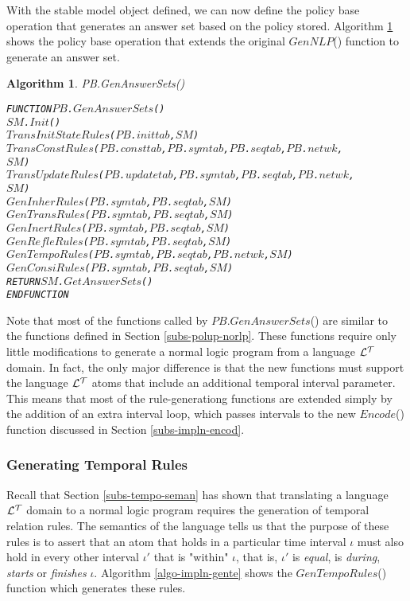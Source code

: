 \documentclass[11pt]{report}
\newenvironment{vverbatim}
{
  \begin{alltt}
}
{
    \vspace{-\baselineskip}
  \end{alltt}
}
\newtheorem{vvalgorithm}{Algorithm}[chapter]
\newenvironment{valgorithm}[2]
{
  \begin{vvalgorithm}{#1}
    \label{#2}
    \small
    \begin{vverbatim}
}
{
    \end{vverbatim}
  \end{vvalgorithm}
}
\begin{document}
        With the stable model object defined, we can now define the policy
        base operation that generates an answer set based on the policy
        stored. Algorithm \ref{algo-impln-genas} shows the policy base
        operation that extends the original $GenNLP$() function to
        generate an answer set.

        \begin{valgorithm}{PB.GenAnswerSets()}{algo-impln-genas}
FUNCTION \(PB\).\(GenAnswerSets\)()
  \(SM\).\(Init\)()
  \(TransInitStateRules\)(\(PB\).\(inittab\), \(SM\))
  \(TransConstRules\)(\(PB\).\(consttab\), \(PB\).\(symtab\), \(PB\).\(seqtab\), \(PB\).\(netwk\),
    \(SM\))
  \(TransUpdateRules\)(\(PB\).\(updatetab\), \(PB\).\(symtab\), \(PB\).\(seqtab\), \(PB\).\(netwk\),
    \(SM\))
  \(GenInherRules\)(\(PB\).\(symtab\), \(PB\).\(seqtab\), \(SM\))
  \(GenTransRules\)(\(PB\).\(symtab\), \(PB\).\(seqtab\), \(SM\))
  \(GenInertRules\)(\(PB\).\(symtab\), \(PB\).\(seqtab\), \(SM\))
  \(GenRefleRules\)(\(PB\).\(symtab\), \(PB\).\(seqtab\), \(SM\))
  \(GenTempoRules\)(\(PB\).\(symtab\), \(PB\).\(seqtab\), \(PB\).\(netwk\), \(SM\))
  \(GenConsiRules\)(\(PB\).\(symtab\), \(PB\).\(seqtab\), \(SM\))
  RETURN \(SM\).\(GetAnswerSets\)()
ENDFUNCTION
        \end{valgorithm}

        Note that most of the functions called by \(PB\).\(GenAnswerSets\)()
        are similar to the functions defined in Section
        \ref{subs-polup-norlp}. These functions require only little
        modifications to generate a normal logic program from a language
        ${\cal L^T}$ domain. In fact, the only major difference is
        that the new functions must support the language ${\cal L^T}$ atoms
        that include an additional temporal interval parameter. This means
        that most of the rule-generationg functions are extended simply by
        the addition of an extra interval loop, which passes intervals to the
        new $Encode$() function discussed in Section \ref{subs-impln-encod}.

        \subsubsection{Generating Temporal Rules}

          Recall that Section \ref{subs-tempo-seman} has shown that translating
          a language ${\cal L^T}$ domain to a normal logic program requires the
          generation of temporal relation rules. The semantics of the language
          tells us that the purpose of these rules is to assert that an atom
          that holds in a particular time interval $\iota$ must also hold in
          every other interval $\iota'$ that is "within" $\iota$, that is,
          $\iota'$ is {\em equal}, is {\em during}, {\em starts} or
          {\em finishes} $\iota$. Algorithm \ref{algo-impln-gente} shows the
          $GenTempoRules$() function which generates these rules.
\end{document}
